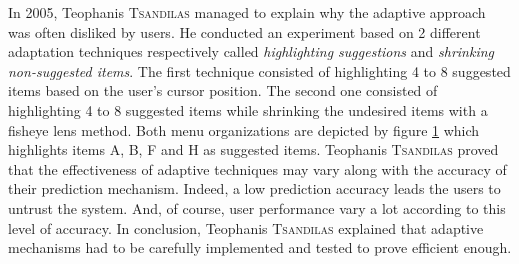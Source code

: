 In 2005, Teophanis \textsc{Tsandilas} \cite{tsandilas} managed to explain why 
the 
adaptive approach was often disliked by users. He conducted an experiment based 
on 2 different adaptation techniques respectively called \textit{highlighting 
suggestions} and \textit{shrinking non-suggested items}. The first technique 
consisted of highlighting 4 to 8 suggested items based on the user’s cursor 
position. The second one consisted of highlighting 4 to 8 suggested items while 
shrinking the undesired items with a fisheye lens method. Both menu 
organizations are depicted by figure \ref{fig:tsandilas_menus} which 
highlights items A, B, F and H as suggested items. Teophanis \textsc{Tsandilas} 
proved 
that the effectiveness of adaptive techniques may vary along with the accuracy 
of their prediction mechanism. Indeed, a low prediction accuracy leads the 
users 
to untrust the system. And, of course, user performance vary a lot according to 
this level of accuracy. In conclusion, Teophanis \textsc{Tsandilas} explained 
that 
adaptive mechanisms had to be carefully implemented and tested to 
prove efficient enough.\newline

\begin{figure}[!ht]
    
    \label{fig:tsandilas_menus}
\end{figure}

